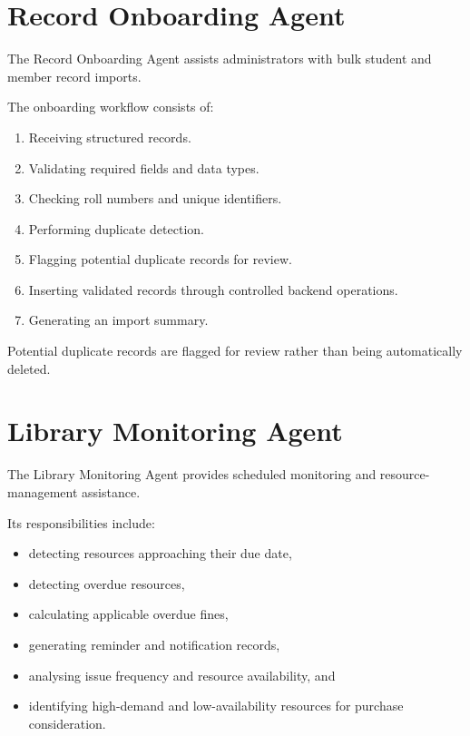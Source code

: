 \documentclass{tietreport}
\begin{document}
\section{Record Onboarding Agent}

The Record Onboarding Agent assists administrators with bulk student and
member record imports.

The onboarding workflow consists of:

\begin{enumerate}

    \item Receiving structured records.

    \item Validating required fields and data types.

    \item Checking roll numbers and unique identifiers.

    \item Performing duplicate detection.

    \item Flagging potential duplicate records for review.

    \item Inserting validated records through controlled backend
    operations.

    \item Generating an import summary.

\end{enumerate}

Potential duplicate records are flagged for review rather than being
automatically deleted.


\section{Library Monitoring Agent}

The Library Monitoring Agent provides scheduled monitoring and
resource-management assistance.

Its responsibilities include:

\begin{itemize}

    \item detecting resources approaching their due date,

    \item detecting overdue resources,

    \item calculating applicable overdue fines,

    \item generating reminder and notification records,

    \item analysing issue frequency and resource availability, and

    \item identifying high-demand and low-availability resources for
    purchase consideration.

\end{itemize}
\end{document}
